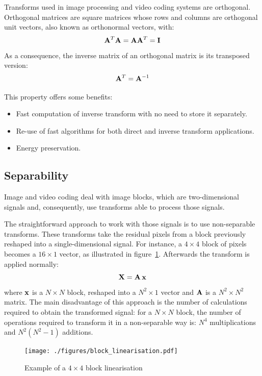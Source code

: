 \documentclass[11pt,a4paper,openright,twoside]{book}
\numberwithin{equation}{section} %
\numberwithin{figure}{section} %
\numberwithin{table}{section} %
\begin{document}
Transforms used in image processing and video coding systems are orthogonal.
Orthogonal matrices are square matrices whose rows and columns are orthogonal
unit vectors, also known as orthonormal vectors, with:
\begin{equation}
	\mathbf{A}^T\mathbf{A} = \mathbf{A}\mathbf{A}^T = \mathbf{I}
\end{equation}
As a consequence, the inverse matrix of an orthogonal matrix is its
transposed version:
\begin{equation}
	\mathbf{A}^T = \mathbf{A}^{-1}
\end{equation}

This property offers some benefits:
\begin{itemize}
	\item Fast computation of inverse transform with no need to store it
		separately.
	\item Re-use of fast algorithms for both direct and inverse transform
		applications.
	\item Energy preservation.
\end{itemize}

\subsection{Separability}
\label{sub:separability}

Image and video coding deal with image blocks, which are two-dimensional
signals and, consequently, use transforms able to process those signals.

The straightforward approach to work with those signals is to use
non-separable transforms.
These transforms take the residual pixels from a block previously reshaped
into a single-dimensional signal.
For instance, a $4\times4$ block of pixels becomes a $16\times1$ vector, as
illustrated in figure~\ref{fig:block_linearisation}.
Afterwards the transform is applied normally:
\begin{equation}
	\mathbf{X} = \mathbf{A} \, \mathbf{x}
\end{equation}
where $\mathbf{x}$ is a $N \times N$ block, reshaped into a $N^2\times1$ vector
and $\mathbf{A}$ is a $N^2 \times N^2$ matrix.
The main disadvantage of this approach is the number of calculations
required to obtain the transformed signal: for a $N \times N$ block, the
number of operations required to transform it in a non-separable way is:
$N^4$ multiplications and $N^2(N^2-1)$ additions.

\begin{figure}[tb]
	\centering
	\texttt{[image: ./figures/block\_linearisation.pdf]}
	\caption{Example of a $4\times4$ block linearisation}
	\label{fig:block_linearisation}
\end{figure}
\end{document}
